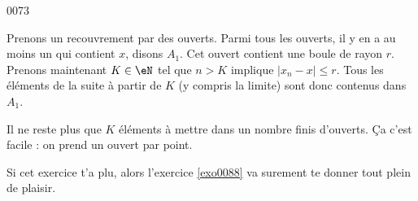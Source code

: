 
\begin{corrige}{0073}

	Prenons un recouvrement par des ouverts. Parmi tous les ouverts, il y en a au moins un qui contient $x$, disons $A_1$. Cet ouvert contient une boule de rayon $r$. Prenons maintenant $K\in\eN$ tel que $n>K$ implique $| x_n-x |\leq r$. Tous les éléments de la suite à partir de $K$ (y compris la limite) sont donc contenus dans $A_1$.

	Il ne reste plus que $K$ éléments à mettre dans un nombre finis d'ouverts. Ça c'est facile : on prend un ouvert par point.

	Si cet exercice t'a plu, alors l'exercice \ref{exo0088} va surement te donner tout plein de plaisir.

\end{corrige}
